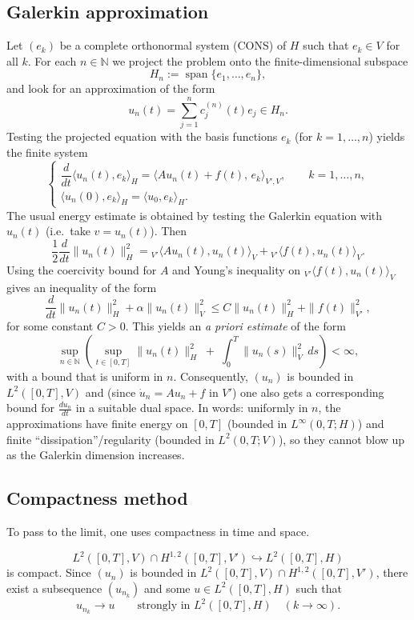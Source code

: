 \documentclass[11pt]{article}
\theoremstyle{definition}
\theoremstyle{remark}
\newcommand{\dual}[2]{{}_{V'}\langle #1, #2 \rangle_{V}}
\begin{document}
\subsection*{Galerkin approximation}
Let $(e_{k})$ be a complete orthonormal system (CONS) of $H$ such that $e_{k}\in V$ for all $k$.
For each $n\in\mathbb{N}$ we project the problem onto the finite-dimensional subspace
\[
H_{n}:=\operatorname{span}\{e_{1},\dots,e_{n}\},
\]
and look for an approximation of the form
\[
u_{n}(t)=\sum_{j=1}^{n} c_{j}^{(n)}(t)e_{j}\in H_{n}.
\]
Testing the projected equation with the basis functions $e_{k}$ (for $k=1,\dots,n$) yields the finite system
\[
\begin{cases}
\dfrac{d}{dt}\langle u_{n}(t),e_{k}\rangle_{H}=\langle A u_n(t)+f(t),\,e_k\rangle_{V',V},\qquad k=1,\dots,n,\\[6pt]
\langle u_{n}(0),e_{k}\rangle_{H}=\langle u_{0},e_{k}\rangle_{H}.
\end{cases}
\]
The usual energy estimate is obtained by testing the Galerkin equation with $u_n(t)$ (i.e.\ take $v=u_n(t)$). Then
\[
\frac12\frac{d}{dt}\|u_n(t)\|_H^2
=
\dual{A u_n(t)}{u_n(t)}+\dual{f(t)}{u_n(t)}.
\]
Using the coercivity bound for $A$ and Young's inequality on $\dual{f(t)}{u_n(t)}$ gives an inequality of the form
\[
\frac{d}{dt}\|u_n(t)\|_H^2+\alpha\|u_n(t)\|_V^2
\le
C\|u_n(t)\|_H^2+\|f(t)\|_{V'}^2,
\]
for some constant $C>0$.
This yields an \emph{a priori estimate} of the form
\[
\sup_{n\in\mathbb{N}}\left(
\sup_{t\in[0,T]}\|u_{n}(t)\|_{H}^{2}
\;+\;
\int_{0}^{T}\|u_{n}(s)\|_{V}^{2}\,ds
\right)
<\infty,
\]
with a bound that is uniform in $n$.
Consequently, $(u_{n})$ is bounded in $L^{2}([0,T],V)$ and (since $\dot u_{n}=Au_{n}+f$ in $V'$) one also gets a corresponding bound for $\frac{du_{n}}{dt}$ in a suitable dual space. In words: uniformly in $n$, the approximations have finite energy on $[0,T]$ (bounded in $L^{\infty}(0,T;H)$) and finite ``dissipation''/regularity (bounded in $L^{2}(0,T;V)$), so they cannot blow up as the Galerkin dimension increases.

\subsection*{Compactness method}
To pass to the limit, one uses compactness in time and space.

\[
L^{2}([0,T],V)\cap H^{1,2}([0,T],V')\hookrightarrow L^{2}([0,T],H)
\]
is compact. Since $(u_n)$ is bounded in $L^{2}([0,T],V)\cap H^{1,2}([0,T],V')$, there exist a subsequence $(u_{n_k})$ and some $u\in L^{2}([0,T],H)$ such that
\[
u_{n_k}\to u \qquad \text{strongly in }L^{2}([0,T],H)\quad (k\to\infty).
\]
\end{document}
